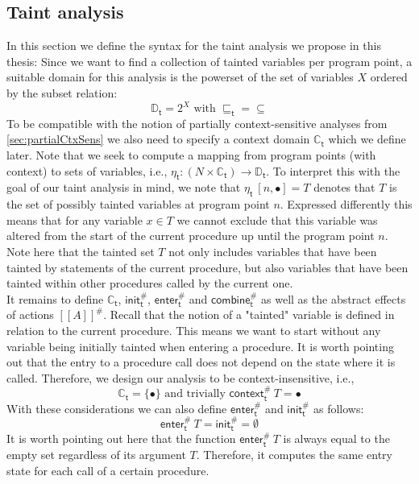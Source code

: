     \subsection{Taint analysis}\label{sec:formalTaint}
      In this section we define the syntax for the taint analysis we propose in this thesis: Since we want to find a collection of tainted variables per program point, a suitable domain for this analysis is the powerset of the set of variables $X$ ordered by the subset relation:
      \[\mathbb{D}_\textsf{t} = 2^X \text{ with } \sqsubseteq_\textsf{t} = \subseteq\]
      To be compatible with the notion of partially context-sensitive analyses from \autoref{sec:partialCtxSens} we also need to specify a context domain $\mathbb{C}_\textsf{t}$ which we define later.
      Note that we seek to compute a mapping from program points (with context) to sets of variables, i.e., $\eta_\textsf{t}: (N \times \mathbb{C}_\textsf{t}) \rightarrow \mathbb{D}_\textsf{t}$. To interpret this with the goal of our taint analysis in mind, we note that $\eta_\textsf{t}\ [n, \bullet] = T$ denotes that $T$ is the set of possibly tainted variables at program point $n$. Expressed differently this means that for any variable $x \in T$ we cannot exclude that this variable was altered from the start of the current procedure up until the program point $n$. Note here that the tainted set $T$ not only includes variables that have been tainted by statements of the current procedure, but also variables that have been tainted within other procedures called by the current one.\\
      It remains to define $\mathbb{C}_\textsf{t}$, $\textsf{init}^{\#}_\textsf{t}$, $\textsf{enter}^{\#}_\textsf{t}$ and $\textsf{combine}^{\#}_\textsf{t}$ as well as the abstract effects of actions $[\![ A ]\!]^{\#}$. Recall that the notion of a "tainted" variable is defined in relation to the current procedure. This means we want to start without any variable being initially tainted when entering a procedure. It is worth pointing out that the entry to a procedure call does not depend on the state where it is called. Therefore, we design our analysis to be context-insensitive, i.e., 
      \[\mathbb{C}_\textsf{t} = \{\bullet\} \text{ and trivially } \textsf{context}^{\#}_\textsf{t}\ T = \bullet\]
      With these considerations we can also define $\textsf{enter}^{\#}_\textsf{t}$ and $\textsf{init}^{\#}_\textsf{t}$ as follows:
      \[\textsf{enter}^{\#}_\textsf{t}\ T = \textsf{init}^{\#}_\textsf{t} = \emptyset\]
      It is worth pointing out here that the function $\textsf{enter}^{\#}_\textsf{t}\ T$ is always equal to the empty set regardless of its argument $T$. Therefore, it computes the same entry state for each call of a certain procedure.\\
